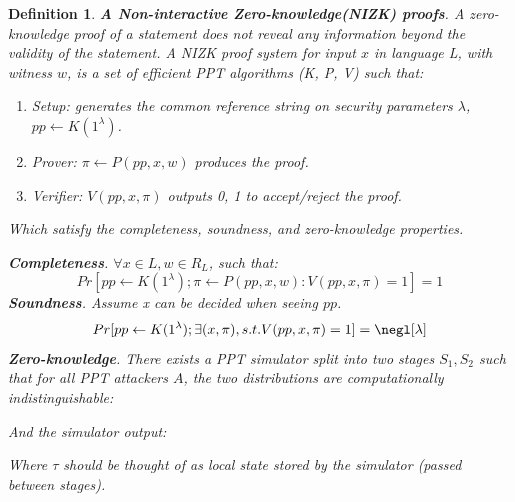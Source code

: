 \documentclass{article}
\newtheorem{myDef}{Definition}
\begin{document}
\begin{myDef}
\label{d:zkp}
\textbf{A Non-interactive Zero-knowledge(NIZK) proofs}. A zero-knowledge proof of a statement does not reveal any information beyond the validity of the statement. A NIZK proof system for input $x$ in language L, with witness $w$, is a set of efficient PPT algorithms (K, P, V) such that:
\begin{enumerate}
    \item Setup: generates the common reference string on security parameters $\lambda$, $pp \gets K(1^\lambda)$.
    \item Prover: $\pi \gets P(pp, x, w)$ produces the proof.
    \item Verifier: $V (pp, x, \pi)$ outputs {0, 1} to accept/reject the proof.
\end{enumerate}
Which satisfy the completeness, soundness, and zero-knowledge properties. 

\noindent\textbf{Completeness}. $\forall x \in L, w \in R_L$, such that:
\begin{equation}
    Pr[pp \gets K(1^{\lambda}); \pi \gets P(pp, x, w): V(pp, x, \pi) = 1] = 1
\end{equation}
\noindent\textbf{Soundness}. Assume x can be decided when seeing $pp$.
\begin{equation}
    Pr[pp \gets K(1^{\lambda}); \exists (x,\pi), s.t. V(pp, x, \pi) = 1] = \negl[\lambda]
\end{equation}
\noindent\textbf{Zero-knowledge}. There exists a PPT simulator split into two stages $S_1, S_2$ such that for all PPT attackers $A$, the two distributions are computationally indistinguishable:

\begin{pchstack}
\end{pchstack}


And the simulator output:

\begin{pchstack}
\end{pchstack}

Where $\tau$ should be thought of as local state stored by the simulator (passed between stages).
\end{myDef}
\end{document}
